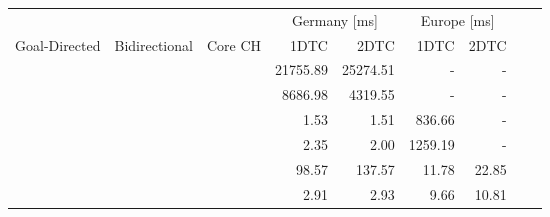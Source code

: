 \begin{tabular}{cccrrrrrr}
	\toprule
	              &               &         & \multicolumn{2}{c}{Germany [\si{\milli\second}]} & \multicolumn{2}{c}{Europe [\si{\milli\second}]}               \\
	Goal-Directed & Bidirectional & Core CH & 1DTC                                             & 2DTC                                            & 1DTC & 2DTC \\
	\midrule
	\xmark        & \xmark        & \xmark  & 21755.89                                                & 25274.51                                               & -    & -    \\
	\xmark        & \cmark        & \xmark  & 8686.98                                                & 4319.55                                               & -    & -    \\
	\cmark        & \xmark        & \xmark  & 1.53                                                & 1.51                                               & 836.66    & -    \\
	\cmark        & \cmark        & \xmark  & 2.35                                                & 2.00                                               & 1259.19    & -    \\
	\xmark        & \cmark        & \cmark  & 98.57                                                & 137.57                                               & 11.78    & 22.85    \\
	\cmark        & \cmark        & \cmark  & 2.91                                                & 2.93                                               & 9.66    & 10.81    \\
	\bottomrule
\end{tabular}